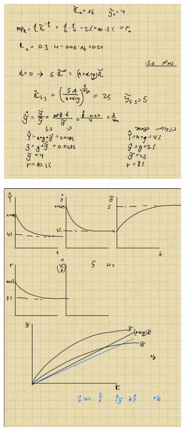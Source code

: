 \documentclass[12pt]{article}
\begin{document}
\begin{figure}[h]
    \begin{small}
        \begin{center}
            \includegraphics[width=0.85\textwidth]{figures/SCR-20240402-urdv.jpeg}
        \end{center}
    \end{small}
\end{figure}

\begin{figure}[h]
    \begin{small}
        \begin{center}
            \includegraphics[width=0.85\textwidth]{figures/SCR-20240403-baer.jpeg}
        \end{center}
    \end{small}
\end{figure}
\end{document}
